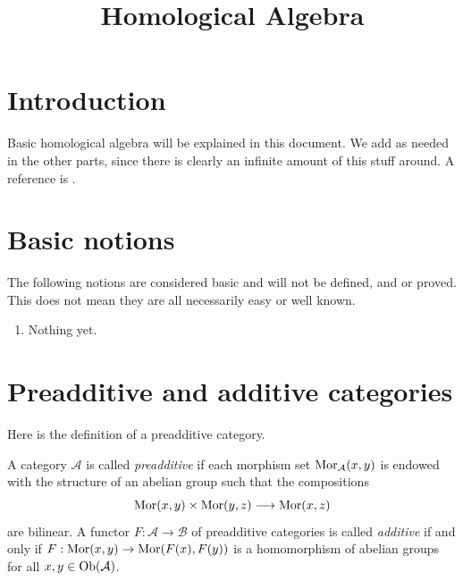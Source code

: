 

%


\title{Homological Algebra}


\maketitle

\label{section-phantom}

\tableofcontents

\section{Introduction}
\label{section-introduction}

\noindent
Basic homological algebra will be explained in this document.
We add as needed in the other parts, since there is clearly
an infinite amount of this stuff around.
A reference is \cite{Maclane}.

\section{Basic notions}
\label{section-topology-basic}

\noindent
The following notions are considered basic and will not be defined,
and or proved. This does not mean they are all necessarily easy or
well known.

\begin{enumerate}
\item Nothing yet.
\end{enumerate}




\section{Preadditive and additive categories}
\label{section-additive-categories}

\noindent
Here is the definition of a preadditive category.

\begin{definition}
\label{definition-preadditive}
A category $\mathcal{A}$ is called {\it preadditive} if each
morphism set $\mathop{\mathrm{Mor}}\nolimits_\mathcal{A}(x, y)$ is endowed
with the structure of an abelian group such that the
compositions
$$
\mathop{\mathrm{Mor}}\nolimits(x, y) \times \mathop{\mathrm{Mor}}\nolimits(y, z)
\longrightarrow
\mathop{\mathrm{Mor}}\nolimits(x, z)
$$
are bilinear. A functor $F : \mathcal{A} \to \mathcal{B}$ of
preadditive categories is called {\it additive} if and only
if $F : \mathop{\mathrm{Mor}}\nolimits(x, y) \to \mathop{\mathrm{Mor}}\nolimits(F(x), F(y))$
is a homomorphism of abelian groups for all
$x, y \in \mathop{\mathrm{Ob}}\nolimits(\mathcal{A})$.
\end{definition}

